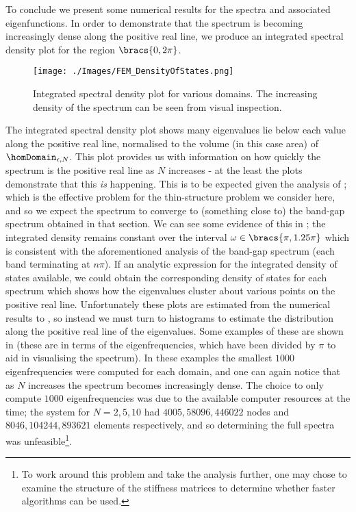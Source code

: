 To conclude we present some numerical results for the spectra and associated eigenfunctions.
In order to demonstrate that the spectrum is becoming increasingly dense along the positive real line, we produce an integrated spectral density plot  for the region $\bracs{0,2\pi}$.
\begin{figure}[b!]
	\centering
	\texttt{[image: ./Images/FEM\_DensityOfStates.png]}
	\caption{Integrated spectral density plot for various domains. The increasing density of the spectrum can be seen from visual inspection.\label{fig:SpectralDensity}}
\end{figure}
The integrated spectral density plot shows many eigenvalues lie below each value along the positive real line, normalised to the volume (in this case area) of $\homDomain_{\epsilon, N}$.
This plot provides us with information on how quickly the spectrum is  the positive real line as $N$ increases - at the least the plots demonstrate that this \textit{is} happening.
This is to be expected given the analysis of ; which is the effective problem for the thin-structure problem we consider here, and so we expect the spectrum to converge to (something close to) the band-gap spectrum obtained in that section.
We can see some evidence of this in ; the integrated density remains constant over the interval $\omega\in\bracs{\pi,1.25\pi}$ which is consistent with the aforementioned analysis of the band-gap spectrum (each band terminating at $n\pi$).
If an analytic expression for the integrated density of states available, we could obtain the corresponding density of states for each spectrum which shows how the eigenvalues cluster about various points on the positive real line.
Unfortunately these plots are estimated from the numerical results to , so instead we must turn to histograms to estimate the distribution along the positive real line of the eigenvalues.
Some examples of these are shown in  (these are in terms of the eigenfrequencies, which have been divided by $\pi$ to aid in visualising the spectrum). 
In these examples the smallest $1000$ eigenfrequencies were computed for each domain, and one can again notice that as $N$ increases the spectrum becomes increasingly dense.
The choice to only compute $1000$ eigenfrequencies was due to the available computer resources at the time; the system for $N=2,5,10$ had $4005,58096,446022$ nodes and $8046,104244,893621$ elements respectively, and so determining the full spectra was unfeasible\footnote{To work around this problem and take the analysis further, one may chose to examine the structure of the stiffness matrices to determine whether faster algorithms can be used.}.
